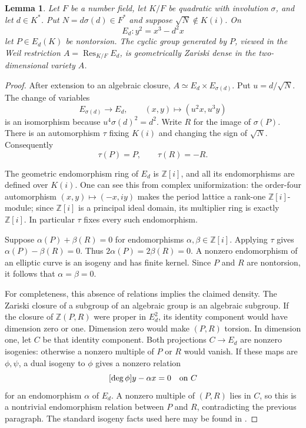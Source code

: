 \documentclass[11pt]{article}
\newtheorem{lemma}[theorem]{Lemma}
\theoremstyle{definition}
\begin{document}
\begin{lemma}\label{lem:conjugate-twist-density}
Let $F$ be a number field, let $K/F$ be quadratic with involution
$\sigma$, and let $d\in K^*$.  Put $N=d\sigma(d)\in F^*$ and
suppose $\sqrt N\notin K(i)$.  On
\[
                         E_d:y^2=x^3-d^2x
\]
let $P\in E_d(K)$ be nontorsion.  The cyclic group generated by
$P$, viewed in the Weil restriction
$A=\operatorname{Res}_{K/F}E_d$, is geometrically Zariski dense
in the two-dimensional variety $A$.
\end{lemma}
\begin{proof}
After extension to an algebraic closure,
$A\simeq E_d\times E_{\sigma(d)}$.  Put $u=d/\sqrt N$.
The change of variables
\[
 E_{\sigma(d)}\longrightarrow E_d,
 \qquad (x,y)\longmapsto(u^2x,u^3y)
\]
is an isomorphism because
$u^4\sigma(d)^2=d^2$.  Write $R$ for the image of
$\sigma(P)$.  There is an automorphism $\tau$ fixing $K(i)$
and changing the sign of $\sqrt N$.  Consequently
\[
                            \tau(P)=P,\qquad\tau(R)=-R.
\]

The geometric endomorphism ring of $E_d$ is $\mathbb Z[i]$,
and all its endomorphisms are defined over $K(i)$.  One can see
this from complex uniformization: the order-four automorphism
$(x,y)\mapsto(-x,iy)$ makes the period lattice a rank-one
$\mathbb Z[i]$-module; since $\mathbb Z[i]$ is a principal ideal
domain, its multiplier ring is exactly $\mathbb Z[i]$.
In particular $\tau$ fixes every such endomorphism.

Suppose $\alpha(P)+\beta(R)=0$ for endomorphisms
$\alpha,\beta\in\mathbb Z[i]$.  Applying $\tau$ gives
$\alpha(P)-\beta(R)=0$.  Thus $2\alpha(P)=2\beta(R)=0$.
A nonzero endomorphism of an elliptic curve is an isogeny and
has finite kernel.  Since $P$ and $R$ are nontorsion, it follows
that $\alpha=\beta=0$.

For completeness, this absence of relations implies the claimed
density.  The Zariski closure of a subgroup of an algebraic group
is an algebraic subgroup.  If the closure of $\mathbb Z(P,R)$
were proper in $E_d^2$, its identity component would have
dimension zero or one.  Dimension zero would make $(P,R)$
torsion.  In dimension one, let $C$ be that identity component.
Both projections $C\to E_d$ are nonzero isogenies: otherwise
a nonzero multiple of $P$ or $R$ would vanish.  If these maps
are $\phi,\psi$, a dual isogeny to $\phi$ gives a nonzero
relation
\[
                       [\deg\phi]y-\alpha x=0
                       \quad\hbox{on }C
\]
for an endomorphism $\alpha$ of $E_d$.  A nonzero multiple of
$(P,R)$ lies in $C$, so this is a nontrivial endomorphism
relation between $P$ and $R$, contradicting the previous
paragraph.  The standard isogeny facts used here may be found
in \cite[Sections 8 and 12]{P3MilneAbelian}.
\end{proof}
\end{document}
